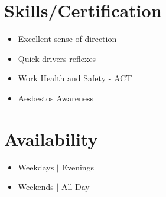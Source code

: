 \documentclass{resume_class}
\begin{document}
	\section{Skills/Certification}
	\begin{itemize}[leftmargin = 10pt , labelsep = 3pt , parsep = 0pt , itemsep = 2pt , label =  {\small $\bullet$} ] 
		\item \mdseries \Large {Excellent sense of direction}
		\item \mdseries \Large  {Quick drivers reflexes}
                \item \mdseries \Large  {Work Health and Safety - ACT}
                \item \mdseries \Large  {Aesbestos Awareness}
	\end{itemize}
	
	\section{Availability }
	\begin{itemize}[leftmargin = 10pt , labelsep = 3pt , parsep = 0pt , itemsep = 2pt , label =  {\small $\bullet$} ] 
		\item \mdseries \Large Weekdays $|$ Evenings
		\item \mdseries \Large Weekends $|$ All Day
	\end{itemize}
	
\end{document}

